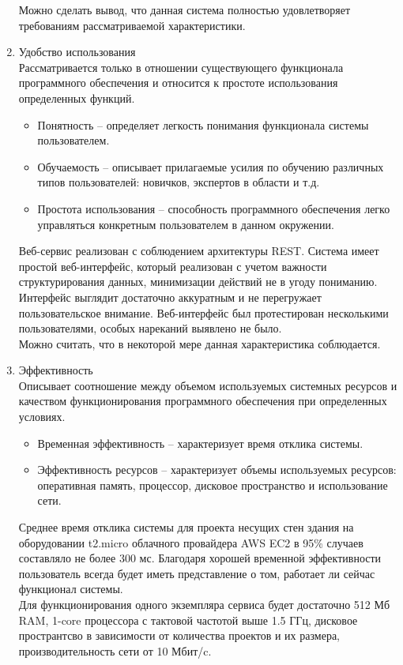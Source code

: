\documentclass[a4paper,14pt]{extreport} %
\begin{document}
\begin{enumerate}
Можно сделать вывод, что данная система полностью удовлетворяет требованиям рассматриваемой характеристики.
\item Удобство использования \\
Рассматривается только в отношении существующего функционала программного обеспечения и относится к простоте использования определенных функций.
\begin{itemize}
\item Понятность -- определяет легкость понимания функционала системы пользователем.
\item Обучаемость -- описывает прилагаемые усилия по обучению различных типов пользователей: новичков, экспертов в области и т.д.
\item Простота использования -- способность программного обеспечения легко управляться конкретным пользователем в данном окружении.
\end{itemize}
Веб-сервис реализован с соблюдением архитектуры REST. Система имеет простой веб-интерфейс, который реализован с учетом важности структурирования данных, минимизации действий не в угоду пониманию. Интерфейс выглядит достаточно аккуратным и не перегружает пользовательское внимание. Веб-интерфейс был протестирован несколькими пользователями, особых нареканий выявлено не было. \\
Можно считать, что в некоторой мере данная характеристика соблюдается.
\item Эффективность \\
Описывает соотношение между объемом используемых системных ресурсов и качеством функционирования программного обеспечения при определенных условиях.
\begin{itemize}
\item Временная эффективность -- характеризует время отклика системы.
\item Эффективность ресурсов -- характеризует объемы используемых ресурсов: оперативная память, процессор, дисковое пространство и использование сети.
\end{itemize}
Среднее время отклика системы для проекта несущих стен здания на оборудовании t2.micro облачного провайдера AWS EC2 в 95\% случаев составляло не более 300 мс. Благодаря хорошей временной эффективности пользователь всегда будет иметь представление о том, работает ли сейчас функционал системы. \\
Для функционирования одного экземпляра сервиса будет достаточно 512 Мб RAM, 1-core процессора с тактовой частотой выше 1.5 ГГц, дисковое пространтсво в зависимости от количества проектов и их размера, производительность сети от 10 Мбит/c.

\end{enumerate}
\end{document}
